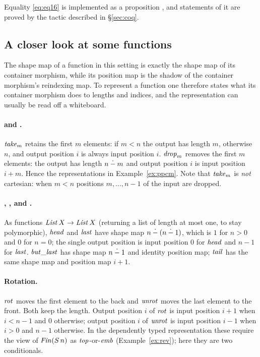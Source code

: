 \documentclass{fundam}
\begin{document}
Equality \eqref{eq:eq16} is implemented as a proposition , and statements of
it are proved by the tactic  described in \S\ref{sec:coq}.

\subsection{A closer look at some functions}\label{sec:closer}

The shape map of a function in this setting is exactly the shape map of its container
morphism, while its position map is the shadow of the container morphism's reindexing
map.  To represent a function one therefore states what its container morphism does to
lengths and indices, and the representation can usually be read off a whiteboard.

\paragraph{ and .}  $\mathit{take}_m$ retains the first $m$ elements: if
$m < n$ the output has length $m$, otherwise $n$, and output position $i$ is always input
position $i$.  $\mathit{drop}_m$ removes the first $m$ elements: the output has length
$n \mathbin{\dot{-}} m$ and output position $i$ is input position $i + m$.  Hence the representations
in Example~\ref{ex:ppcm}.  Note that $\mathit{take}_m$ is \emph{not} cartesian: when $m < n$
positions $m, \dots, n-1$ of the input are dropped.

\paragraph{, ,  and .}  As functions
$\mathit{List}\,X \to \mathit{List}\,X$ (returning a list of length at most one, to stay polymorphic),
$\mathit{head}$ and $\mathit{last}$ have shape map $n \mathbin{\dot{-}} (n \mathbin{\dot{-}} 1)$, which is $1$ for $n > 0$
and $0$ for $n = 0$; the single output position is input position $0$ for $\mathit{head}$ and
$n - 1$ for $\mathit{last}$.  $\mathit{but\_last}$ has shape map $n \mathbin{\dot{-}} 1$ and identity position
map; $\mathit{tail}$ has the same shape map and position map $i + 1$.

\paragraph{Rotation.}  $\mathit{rot}$ moves the first element to the back and
$\mathit{unrot}$ moves the last element to the front.  Both keep the length.  Output position
$i$ of $\mathit{rot}$ is input position $i + 1$ when $i < n - 1$ and $0$ otherwise; output
position $i$ of $\mathit{unrot}$ is input position $i - 1$ when $i > 0$ and $n - 1$ otherwise.
In the dependently typed representation these require the view of $\mathit{Fin}(S\,n)$ as
$\mathit{top}$-or-$\mathit{emb}$ (Example~\ref{ex:rev}); here they are two conditionals.
\end{document}
